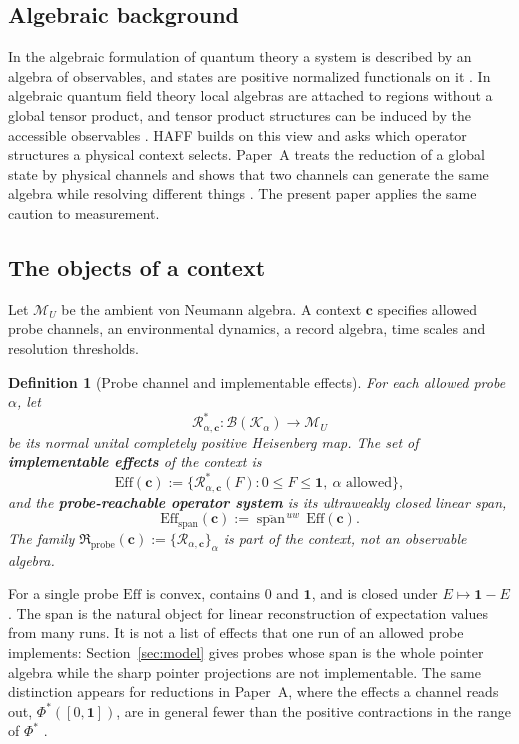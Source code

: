 \documentclass[12pt,a4paper]{article}
\newtheorem{definition}[theorem]{Definition}
\begin{document}
\subsection{Algebraic background}

In the algebraic formulation of quantum theory a system is described by an algebra of observables, and states are positive normalized functionals on it \cite{Haag1996,Araki1999}. In algebraic quantum field theory local algebras are attached to regions without a global tensor product, and tensor product structures can be induced by the accessible observables \cite{Zanardi2001,Zanardi2004}. HAFF builds on this view and asks which operator structures a physical context selects. Paper~A treats the reduction of a global state by physical channels and shows that two channels can generate the same algebra while resolving different things \cite{Liu2026PaperA}. The present paper applies the same caution to measurement.

\subsection{The objects of a context}

Let $\mathcal M_U$ be the ambient von Neumann algebra. A context $\mathbf c$ specifies allowed probe channels, an environmental dynamics, a record algebra, time scales and resolution thresholds.

\begin{definition}[Probe channel and implementable effects]
\label{def:probe-effects}
For each allowed probe $\alpha$, let
\[
\mathcal R_{\alpha,\mathbf c}^{*}:\mathcal B(\mathcal K_\alpha)\longrightarrow\mathcal M_U
\]
be its normal unital completely positive Heisenberg map. The set of \textbf{implementable effects} of the context is
\[
\mathrm{Eff}(\mathbf c):=\{\mathcal R_{\alpha,\mathbf c}^{*}(F):0\le F\le\mathbf 1,\ \alpha\text{ allowed}\},
\]
and the \textbf{probe-reachable operator system} is its ultraweakly closed linear span,
\[
\mathrm{Eff}_{\mathrm{span}}(\mathbf c):=\overline{\operatorname{span}}^{\,uw}\,\mathrm{Eff}(\mathbf c).
\]
The family $\mathfrak R_{\mathrm{probe}}(\mathbf c):=\{\mathcal R_{\alpha,\mathbf c}\}_\alpha$ is part of the context, not an observable algebra.
\end{definition}

For a single probe $\mathrm{Eff}$ is convex, contains $0$ and $\mathbf 1$, and is closed under $E\mapsto\mathbf 1-E$. The span is the natural object for linear reconstruction of expectation values from many runs. It is not a list of effects that one run of an allowed probe implements: Section~\ref{sec:model} gives probes whose span is the whole pointer algebra while the sharp pointer projections are not implementable. The same distinction appears for reductions in Paper~A, where the effects a channel reads out, $\Phi^*([0,\mathbf 1])$, are in general fewer than the positive contractions in the range of $\Phi^*$ \cite{Liu2026PaperA}.
\end{document}
